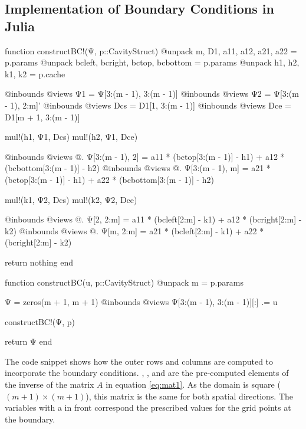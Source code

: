 
\begin{appendices}

\section{Implementation of Boundary Conditions in Julia}

\begin{jllisting}[caption={Boundary construction function for the matrix
  $\Psi$, below the inplace and out of place versions of this function
  \vspace{3pt}}]
function constructBC!(Ψ, p::CavityStruct)
    @unpack m, D1, a11, a12, a21, a22 = p.params 
    @unpack bcleft, bcright, bctop, bcbottom = p.params
    @unpack h1, h2, k1, k2 = p.cache

    @inbounds @views Ψ1 = Ψ[3:(m - 1), 3:(m - 1)]
    @inbounds @views Ψ2 = Ψ[3:(m - 1), 2:m]'
    @inbounds @views Dcs = D1[1, 3:(m - 1)]
    @inbounds @views Dce = D1[m + 1, 3:(m - 1)]

    mul!(h1, Ψ1, Dcs)
    mul!(h2, Ψ1, Dce)

    @inbounds @views @. Ψ[3:(m - 1), 2] = a11 * (bctop[3:(m - 1)] - h1) +
                                          a12 * (bcbottom[3:(m - 1)] - h2)
    @inbounds @views @. Ψ[3:(m - 1), m] = a21 * (bctop[3:(m - 1)] - h1) +
                                          a22 * (bcbottom[3:(m - 1)] - h2)

    mul!(k1, Ψ2, Dcs)
    mul!(k2, Ψ2, Dce)

    @inbounds @views @. Ψ[2, 2:m] = a11 * (bcleft[2:m] - k1) +
                                    a12 * (bcright[2:m] - k2)
    @inbounds @views @. Ψ[m, 2:m] = a21 * (bcleft[2:m] - k1) + 
                                    a22 * (bcright[2:m] - k2)

    return nothing
end

function constructBC(u, p::CavityStruct)
    @unpack m = p.params

    Ψ = zeros(m + 1, m + 1)
    @inbounds @views Ψ[3:(m - 1), 3:(m - 1)][:] .= u

    constructBC!(Ψ, p)

    return Ψ
end
\end{jllisting}

The code snippet shows how the outer rows and columns are computed to
incorporate the boundary conditions. , ,  and
 are the pre-computed elements of the inverse of the matrix $A$ in
equation \eqref{eq:mat1}. As the domain is square ($(m+1) \times (m+1)$), this
matrix is the same for both spatial directions. The variables with a 
in front correspond the prescribed values for the grid points at the boundary.


\end{appendices}

